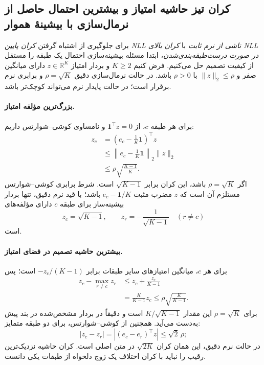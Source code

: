 \subsection{کران تیز حاشیه امتیاز و بیشترین احتمال حاصل از نرمال‌سازی با بیشینهٔ هموار}
\label{app:ch3-normalized-softmax-ceiling}
برای جلوگیری از اشتباه گرفتن
\emph{کران پایین NLL ناشی از نرم ثابت}
با \emph{کران بالای NLL در صورت
درست‌طبقه‌بندی‌شدن}،
ابتدا مسئله بیشینه‌سازی احتمال
یک طبقه را مستقل از کیفیت تصمیم
حل می‌کنیم. فرض کنیم $K\ge2$ و
بردار امتیاز $z\in\mathbb R^K$
دارای میانگین صفر و
$\|z\|_2\le\rho$ با $\rho>0$ باشد.
در حالت نرمال‌سازی دقیق
$\rho=\sqrt K$ و برابری نرم
برقرار است؛ در حالت پایدار
نرم می‌تواند کوچک‌تر باشد.

\paragraph{بزرگ‌ترین مؤلفه امتیاز.}
برای هر طبقه $c$،
از $\mathbf1^\top z=0$
و نامساوی کوشی--شوارتس داریم:
\begin{equation}\label{eq:app-ch3-normalized-max-logit}
\begin{aligned}
z_c
&=\left(e_c-\frac1K\mathbf1\right)^\top z\\
&\le\left\|e_c-\frac1K\mathbf1\right\|_2\|z\|_2\\
&\le\rho\sqrt{\frac{K-1}{K}}.
\end{aligned}
\end{equation}
اگر $\rho=\sqrt K$ باشد،
این کران برابر $\sqrt{K-1}$ است.
شرط برابری کوشی--شوارتس
مستلزم آن است که $z$ مضرب
مثبت $e_c-\mathbf1/K$ باشد؛
با قید نرم دقیق، تنها بردار
بیشینه‌ساز برای طبقه $c$
دارای مؤلفه‌های
\[
z_c=\sqrt{K-1},
\qquad
z_r=-\frac1{\sqrt{K-1}}
\quad(r\ne c)
\]
است.

\paragraph{بیشترین حاشیه تصمیم در فضای امتیاز.}
برای هر $c$،
میانگین امتیازهای سایر
طبقات برابر
$-z_c/(K-1)$ است؛ پس
\[
\begin{aligned}
z_c-\max_{r\ne c}z_r
&\le z_c+\frac{z_c}{K-1}\\
&=\frac{K}{K-1}z_c
\le\rho\sqrt{\frac K{K-1}}.
\end{aligned}
\]
برای $\rho=\sqrt K$ این مقدار
$K/\sqrt{K-1}$ است
و دقیقاً در بردار مشخص‌شده
در بند پیش به‌دست می‌آید.
همچنین از کوشی--شوارتس،
برای دو طبقه متمایز:
\[
|z_c-z_r|
=\left|(e_c-e_r)^\top z\right|
\le\sqrt2\,\rho;
\]
در حالت نرم دقیق،
این همان کران $\sqrt{2K}$
در متن اصلی است.
کران حاشیه نزدیک‌ترین رقیب
را نباید با کران اختلاف
یک زوج دلخواه از طبقات یکی دانست.

